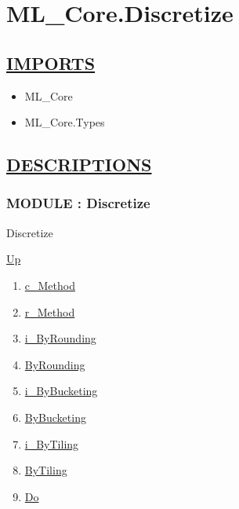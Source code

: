 \chapter*{ML\_Core.Discretize}
\hypertarget{ecldoc:toc:ML_Core.Discretize}{}

\section*{\underline{IMPORTS}}
\begin{itemize}
\item ML\_Core
\item ML\_Core.Types
\end{itemize}

\section*{\underline{DESCRIPTIONS}}
\subsection*{MODULE : Discretize}
\hypertarget{ecldoc:ML_Core.Discretize}{}
\begin{minipage}[t]{\textwidth}
\begin{flushleft}
 Discretize 
\end{flushleft}
\end{minipage}
\hyperlink{ecldoc:toc:ML_Core}{Up}

\par
\par
\begin{enumerate}
\item \hyperlink{ecldoc:ecldoc-c_Method}{c\_Method}
\item \hyperlink{ecldoc:ml_core.discretize.r_method}{r\_Method}
\item \hyperlink{ecldoc:ml_core.discretize.i_byrounding}{i\_ByRounding}
\item \hyperlink{ecldoc:ml_core.discretize.byrounding}{ByRounding}
\item \hyperlink{ecldoc:ml_core.discretize.i_bybucketing}{i\_ByBucketing}
\item \hyperlink{ecldoc:ml_core.discretize.bybucketing}{ByBucketing}
\item \hyperlink{ecldoc:ml_core.discretize.i_bytiling}{i\_ByTiling}
\item \hyperlink{ecldoc:ml_core.discretize.bytiling}{ByTiling}
\item \hyperlink{ecldoc:ml_core.discretize.do}{Do}
\end{enumerate}
